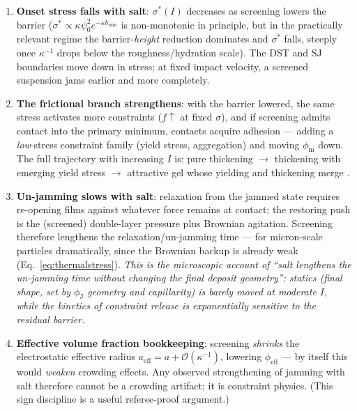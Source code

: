 \documentclass[11pt]{article}
\newcommand{\phiJ}{\phi_{\mathrm{J}}}
\newcommand{\phiM}{\phi_{\mathrm{m}}}
\newcommand{\sigmastar}{\sigma^{*}}
\begin{document}
\begin{enumerate}
\item \textbf{Onset stress falls with salt}: $\sigmastar(I)$ decreases as screening lowers the barrier ($\sigmastar \propto \kappa\psi_0^2 e^{-\kappa h_{\min}}$ is non-monotonic in principle, but in the practically relevant regime the barrier-\emph{height} reduction dominates and $\sigmastar$ falls, steeply once $\kappa^{-1}$ drops below the roughness/hydration scale). The DST and SJ boundaries move down in stress; at fixed impact velocity, a screened suspension jams earlier and more completely.
\item \textbf{The frictional branch strengthens}: with the barrier lowered, the same stress activates more constraints ($f\uparrow$ at fixed $\sigma$), and if screening admits contact into the primary minimum, contacts acquire adhesion --- adding a \emph{low}-stress constraint family (yield stress, aggregation) and moving $\phiM$ down. The full trajectory with increasing $I$ is: pure thickening $\to$ thickening with emerging yield stress $\to$ attractive gel whose yielding and thickening merge \cite{guy2018,richards2020}.
\item \textbf{Un-jamming slows with salt}: relaxation from the jammed state requires re-opening films against whatever force remains at contact; the restoring push is the (screened) double-layer pressure plus Brownian agitation. Screening therefore lengthens the relaxation/un-jamming time --- for micron-scale particles dramatically, since the Brownian backup is already weak (Eq.~\eqref{eq:thermalstress}). \emph{This is the microscopic account of ``salt lengthens the un-jamming time without changing the final deposit geometry'': statics (final shape, set by $\phiJ$ geometry and capillarity) is barely moved at moderate $I$, while the kinetics of constraint release is exponentially sensitive to the residual barrier.}
\item \textbf{Effective volume fraction bookkeeping}: screening \emph{shrinks} the electrostatic effective radius $a_{\mathrm{eff}} = a + \mathcal{O}(\kappa^{-1})$, lowering $\phi_{\mathrm{eff}}$ --- by itself this would \emph{weaken} crowding effects. Any observed strengthening of jamming with salt therefore cannot be a crowding artifact; it is constraint physics. (This sign discipline is a useful referee-proof argument.)
\end{enumerate}
\end{document}
